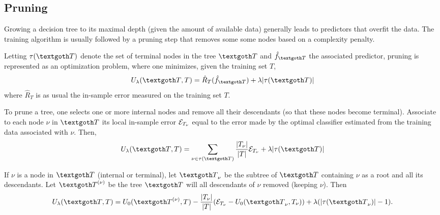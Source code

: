 %
%
%
\subsection{Pruning}


Growing  a decision tree to its maximal depth (given the amount of
available data) generally leads to predictors that overfit the data. The training algorithm is usually  followed by a pruning step that removes some some nodes based on a complexity penalty.

Letting $\tau(\CTR)$ denote the set of terminal nodes in the tree $\CTR$ and $\hat f_{\CTR}$ the associated predictor, pruning is represented as an optimization problem, where one minimizes, given the training set $T$,
\[
U_\lambda(\CTR, T) =  \hat R_T(\hat f_{\CTR}) +\lambda |\tau(\CTR)|
\]
where $\hat R_T$ is as usual the in-sample error measured on the training set $T$. 

To prune a tree, one selects one or more internal nodes and remove all their descendants (so that these nodes become terminal). Associate to each node $\nu$ in $\CTR$ its local in-sample error ${\mathcal E}_{T_\nu}$ equal to the error made by the optimal classifier estimated from the training data associated with $\nu$. Then, 
\[
U_\lambda(\CTR, T) = \sum_{\nu\in \tau(\CTR)} \frac{|T_\nu|}{|T|} \CE_{T_\nu} + \lambda |\tau(\CTR)|
\]

If $\nu$ is a node in $\CTR$ (internal or terminal), let $\CTR_\nu$ be the subtree of $\CTR$ containing $\nu$ as a root and all its descendants. Let $\CTR^{(\nu)}$ be the tree $\CTR$ will all descendants of $\nu$ removed (keeping $\nu$). Then
\[
U_\lambda(\CTR, T) = U_0(\CTR^{(\nu)}, T) - \frac{|T_\nu|}{|T|} (\CE_{T_\nu} - U_0(\CTR_\nu, T_\nu))  + \lambda (|\tau(\CTR_\nu)|-1).
\]

